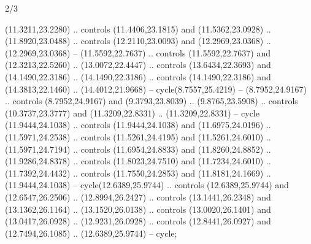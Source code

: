 \begin{flagdescription}{2/3}
{\begin{scope}[xshift=0.5\flaglength,yshift=0.5\flagwidth,scale=\flagwidth/33.602]
\begin{scope}[y=0.8pt, x=0.8pt, yscale=-1,shift={(-12,-26)}]
    (11.3211,23.2280) .. controls (11.4406,23.1815) and (11.5362,23.0928) ..
    (11.8920,23.0488) .. controls (12.2110,23.0093) and (12.2969,23.0368) ..
    (12.2969,23.0368) -- (11.5592,22.7637) .. controls (11.5592,22.7637) and
    (12.3213,22.5260) .. (13.0072,22.4447) .. controls (13.6434,22.3693) and
    (14.1490,22.3186) .. (14.1490,22.3186) .. controls (14.1490,22.3186) and
    (14.3813,22.1460) .. (14.4012,21.9668) -- cycle(8.7557,25.4219) --
    (8.7952,24.9167) .. controls (8.7952,24.9167) and (9.3793,23.8039) ..
    (9.8765,23.5908) .. controls (10.3737,23.3777) and (11.3209,22.8331) ..
    (11.3209,22.8331) -- cycle (11.9444,24.1038) ..
    controls (11.9444,24.1038) and (11.6975,24.0196) .. (11.5971,24.2538) ..
    controls (11.5261,24.4195) and (11.5261,24.6010) .. (11.5971,24.7194) ..
    controls (11.6954,24.8833) and (11.8260,24.8852) .. (11.9286,24.8378) ..
    controls (11.8023,24.7510) and (11.7234,24.6010) .. (11.7392,24.4432) ..
    controls (11.7550,24.2853) and (11.8181,24.1669) .. (11.9444,24.1038) --
    cycle(12.6389,25.9744) ..
    controls (12.6389,25.9744) and (12.6547,26.2506) .. (12.8994,26.2427) ..
    controls (13.1441,26.2348) and (13.1362,26.1164) .. (13.1520,26.0138) ..
    controls (13.0020,26.1401) and (13.0417,26.0928) .. (12.9231,26.0928) ..
    controls (12.8441,26.0927) and (12.7494,26.1085) .. (12.6389,25.9744) --
    cycle;
\end{scope}
\end{scope}}
\begin{scope}[xshift=0.25\flaglength+0.025\flagwidth,yshift=0.275\flagwidth]
\kopf
\end{scope}
\begin{scope}[xshift=-0.25\flaglength-0.025\flagwidth,yshift=0.275\flagwidth]
\kopf
\end{scope}
\begin{scope}[xshift=0.25\flaglength+0.025\flagwidth,yshift=-0.275\flagwidth]
\kopf
\end{scope}
\begin{scope}[xshift=-0.25\flaglength-0.025\flagwidth,yshift=-0.275\flagwidth]
\kopf
\end{scope}



\framecode{}
\end{flagdescription}
